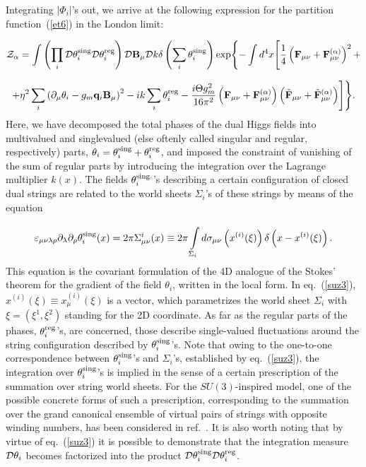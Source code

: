 \documentclass[a4paper,12pt]{article}
\begin{document}
Integrating $|\Phi_i|$'s out, we arrive at the following expression for the partition function~(\ref{et6})
in the London limit:

$$
{\cal Z}_\alpha=\int\left(\prod\limits_{i}^{}
{\cal D}\theta_i^{\rm sing}{\cal D}\theta_i^{\rm reg}\right) {\cal D}{\bf B}_\mu{\cal D}k
\delta\left(\sum\limits_{i}^{}
\theta_i^{\rm sing}\right)\exp\Biggl\{-\int d^4x\Biggl[\frac14\left({\bf F}_{\mu\nu}+{\bf F}_{\mu\nu}^{(\alpha)}\right)^2+$$

\begin{equation}
\label{et7}
+\eta^2\sum\limits_{i}^{}\left(\partial_\mu\theta_i-
g_m{\bf q}_i{\bf B}_\mu\right)^2-ik\sum\limits_{i}^{}\theta_i^{\rm reg}-\frac{i\Theta g_m^2}{16\pi^2}
\left({\bf F}_{\mu\nu}+{\bf F}_{\mu\nu}^{(\alpha)}\right)
\left(\tilde{\bf F}_{\mu\nu}+\tilde{\bf F}_{\mu\nu}^{(\alpha)}\right)
\Biggr]\Biggr\}.
\end{equation}
Here, we have decomposed the total phases
of the dual Higgs
fields into multivalued and singlevalued (else oftenly called singular and
regular, respectively) parts, $\theta_i=
\theta_i^{\rm sing}+
\theta_i^{\rm reg}$, and imposed the constraint of vanishing of the
sum of regular parts by introducing the integration over the
Lagrange multiplier $k(x)$. The fields
$\theta_i^{\rm sing.}$'s
describing a certain configuration of closed dual strings
are related to the world sheets
$\Sigma_i$'s of these strings
by means of the equation

\begin{equation}
\label{suz3}
\varepsilon_{\mu\nu\lambda\rho}\partial_\lambda\partial_\rho
\theta_i^{\rm sing}(x)=2\pi\Sigma_{\mu\nu}^i(x)\equiv
2\pi\int\limits_{\Sigma_i}^{}d\sigma_{\mu\nu}\left(x^{(i)}(\xi)\right)
\delta\left(x-x^{(i)}(\xi)\right).
\end{equation}
This equation is the covariant formulation
of the 4D analogue of the Stokes' theorem for the gradient
of the field $\theta_i$, written in the local form. In eq.~(\ref{suz3}),
$x^{(i)}(\xi)\equiv x_\mu^{(i)}(\xi)$ is a vector, which parametrizes
the world sheet $\Sigma_i$ with $\xi=(\xi^1, \xi^2)$
standing for the 2D coordinate. As far as
the regular parts of the phases, $\theta_i^{\rm reg}$'s, are concerned,
those describe single-valued fluctuations around the string configuration described by $\theta_i^{\rm sing}$'s.
Note that owing to the one-to-one correspondence between
$\theta_i^{\rm sing}$'s and $\Sigma_i$'s, established by
eq.~(\ref{suz3}),
the integration over $\theta_i^{\rm sing}$'s is implied
in the sense of a certain prescription of the summation
over string world sheets. For the $SU(3)$-inspired model, one of the possible
concrete forms of such a prescription, corresponding to the summation
over the grand canonical ensemble of
virtual pairs of strings with opposite winding numbers, has been
considered in ref.~\cite{moresu3}.
It is also worth noting that by virtue of eq.~(\ref{suz3}) it is possible to demonstrate that
the integration measure ${\cal D}\theta_i$ becomes
factorized into the product ${\cal D}\theta_i^{\rm sing}{\cal D}\theta_i^{\rm reg}$.
\end{document}
